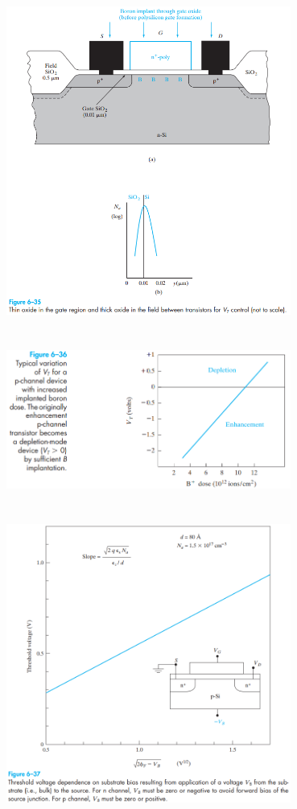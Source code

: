 \documentclass[8pt]{article}
\newcommand{\hl}{\noindent\makebox[\linewidth]{\rule{\textwidth}{0.2pt}}}
\begin{document}
\begin{center}
		\includegraphics[width=0.7\textwidth]{fig6-35} \\ \hl \\~\\
		\includegraphics[width=0.7\textwidth]{fig6-36} \\ \hl \\~\\
		\includegraphics[width=0.7\textwidth]{fig6-37} \\ \hl \\~\\

\end{center}
\end{document}
